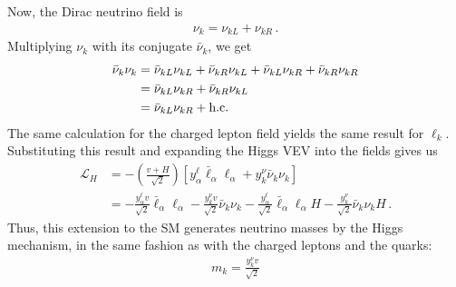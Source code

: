 \documentclass[draft=True]{revtex4-2}
\begin{document}
Now, the Dirac neutrino field is
\begin{align}
    \nu_k = \nu_{kL} + \nu_{kR}\,.
\end{align}
Multiplying $\nu_k$ with its conjugate $\bar{\nu}_k$, we get 
\begin{align}
    \bar{\nu}_k \nu_k 
    & = \bar{\nu}_{k L} \nu_{k L} +\bar{\nu}_{k R}\nu_{k L} + \bar{\nu}_{k L}\nu_{k R} + \bar{\nu}_{k R}\nu_{k R} \nonumber \\
    & = \bar{\nu}_{k L}\nu_{k R} + \bar{\nu}_{k R}\nu_{k L} \nonumber \\
    & = \bar{\nu}_{k L}\nu_{k R} + \text{{h.c.}}
\end{align}
The same calculation for the charged lepton field yields the same result for $\ell_k$. Substituting this result and expanding the Higgs VEV into the fields gives us
\begin{align}
    \mathcal{L}_{H} 
    &=-\left( \frac{v + H}{\sqrt{2}} \right) \left[ y_{\alpha}^{\ell}   \bar{\ell}_\alpha \ell_\alpha  +  y_{k}^{\nu} \bar{\nu}_k \nu_k \right] \nonumber \\
    &=- \frac{y_{\alpha}^{\ell} v}{\sqrt{2}}   \bar{\ell}_\alpha \ell_\alpha   -  \frac{ y_{k}^{\nu} v}{\sqrt{2}} \bar{\nu}_k \nu_k  - \frac{y_{\alpha}^{\ell}}{\sqrt{2}}   \bar{\ell}_\alpha \ell_\alpha H  -  \frac{ y_{k}^{\nu}}{\sqrt{2}} \bar{\nu}_k \nu_k H\,.
\end{align}
Thus, this extension to the SM generates neutrino masses by the Higgs mechanism, in the same fashion as with the charged leptons and the quarks:
\begin{align}
    m_k = \frac{y_k^\nu v}{\sqrt{2}}
\end{align}
\end{document}
